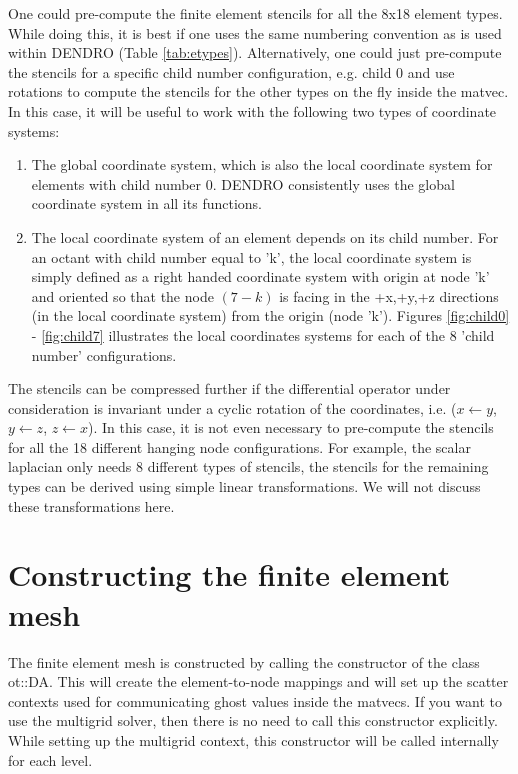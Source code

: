 \documentclass[10pt,reqno,a4paper]{report}
\numberwithin{equation}{section}
\begin{document}
One could pre-compute the finite element stencils for all the 8x18 element types. While doing this, it is best if one uses the same numbering convention as is used within DENDRO (Table \ref{tab:etypes}).  Alternatively, one could just pre-compute the stencils for a specific child number configuration, e.g. child 0 and use rotations to compute the stencils for the other types on the fly inside the matvec. In this case, it will be useful to work with the following two types of coordinate systems:
\begin{enumerate}
\item The global coordinate system, which is also the local coordinate system for elements with child number 0. DENDRO consistently uses the global coordinate system in all its functions. 
\item The local coordinate system of an element depends on its child number. For an octant with child number equal to 'k', the local coordinate system is simply defined as a right handed coordinate system with origin at node 'k' and oriented so that the node $(7-k)$ is facing in the +x,+y,+z directions (in the local coordinate system) from the origin (node 'k'). Figures \ref{fig:child0} - \ref{fig:child7} illustrates the local coordinates systems for each of the 8 'child number' configurations. 
\end{enumerate}

The stencils can be compressed further if the differential operator under consideration is invariant under a cyclic rotation of the coordinates, i.e. ($x \leftarrow y$, $y \leftarrow z$, $z \leftarrow x$). In this case, it is not even necessary to pre-compute the stencils for all the 18 different hanging node configurations. For example, the scalar laplacian only needs 8 different types of stencils, the stencils for the remaining types can be derived using simple linear transformations. We will not discuss these transformations here. 

\section{Constructing the finite element mesh}
\label{sec:daconstructor}
The finite element mesh is constructed by calling the constructor of the class ot::DA. This will create the element-to-node mappings and will set up the scatter contexts used for communicating ghost values inside the matvecs. If you want to use the multigrid solver, then there is no need to call this constructor explicitly. While setting up the multigrid context, this constructor will be called internally for each level.
\end{document}
